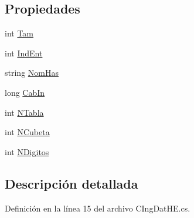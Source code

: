 \subsection*{Propiedades}
\begin{DoxyCompactItemize}
\item 
int \hyperlink{class_diccionario_1_1_c_ing_dat_h_e_a43943d6e7a0c8c7c4475f651f64aed58}{Tam}
\item 
int \hyperlink{class_diccionario_1_1_c_ing_dat_h_e_add3ac954600ec9649692b4873e08197b}{Ind\-Ent}
\item 
string \hyperlink{class_diccionario_1_1_c_ing_dat_h_e_aaebba742bbc0cd1db58970dcfcfc7458}{Nom\-Has}
\item 
long \hyperlink{class_diccionario_1_1_c_ing_dat_h_e_ab6b929f1feca797c9367692e224f1169}{Cab\-In}
\item 
int \hyperlink{class_diccionario_1_1_c_ing_dat_h_e_a2b174cbc4709ba0781addc2f86542303}{N\-Tabla}
\item 
int \hyperlink{class_diccionario_1_1_c_ing_dat_h_e_ab65a1a899ee3b50f48be4a82666b0fec}{N\-Cubeta}
\item 
int \hyperlink{class_diccionario_1_1_c_ing_dat_h_e_af9f1402b6cba6ed823ea1bbc9d8c2471}{N\-Digitos}
\end{DoxyCompactItemize}


\subsection{Descripción detallada}


Definición en la línea 15 del archivo C\-Ing\-Dat\-H\-E.\-cs.



